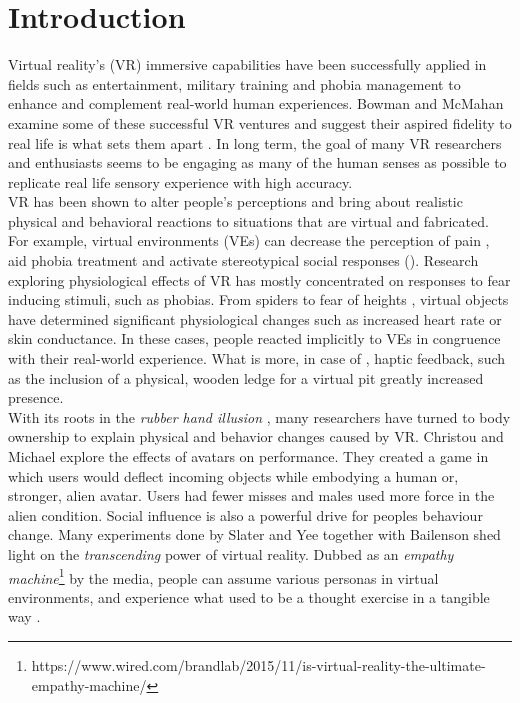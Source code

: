 \section{Introduction}
\label{section:intro}
Virtual reality's (VR) immersive capabilities have been successfully applied in fields such as entertainment, military training and phobia management to enhance and complement real-world human experiences. Bowman and McMahan examine some of these successful VR ventures and suggest their aspired fidelity to real life is what sets them apart \cite{bowman2007virtual}. In long term, the goal of many VR researchers and enthusiasts seems to be engaging as many of the human senses as possible to replicate real life sensory experience with high accuracy.
\\
VR has been shown to alter people's  perceptions and bring about realistic physical and behavioral reactions to situations that are virtual and fabricated. For example, virtual environments (VEs) can decrease the perception of pain \cite{muhlberger2007pain}, aid phobia treatment \cite{parsons2008affective} and activate stereotypical social responses (\cite{dotsch2008virtual}). Research exploring physiological effects of VR has mostly concentrated on responses to fear inducing stimuli, such as phobias. From spiders \cite{garcia2002virtual} to fear of heights \cite{meehan2002physiological}, virtual objects have determined significant physiological changes such as increased heart rate or skin conductance. In these cases, people reacted implicitly to VEs in congruence with their real-world experience. What is more, in case of \cite{meehan2002physiological}, haptic feedback, such as the inclusion of a physical, wooden ledge for a virtual pit greatly increased presence.  
\\
With its roots in the \textit{rubber hand illusion} \cite{botvinick1998rubber}, many researchers have turned to body ownership to explain physical and behavior changes caused by VR. Christou and Michael explore the effects of avatars on performance. They created a game in which users would deflect incoming objects while embodying a human or, stronger, alien avatar. Users had fewer misses and males used more force in the alien condition. Social influence is also a powerful drive for peoples behaviour change. Many experiments done by Slater \cite{slater2014transcending,slater2006virtual} and Yee together with Bailenson \cite{yee2009proteus} shed light on the \textit{transcending} power of virtual reality. Dubbed as an \textit{empathy machine}\footnote{https://www.wired.com/brandlab/2015/11/is-virtual-reality-the-ultimate-empathy-machine/} by the media, people can assume various personas in virtual environments, and experience what used to be a thought exercise in a tangible way \cite{shin2018empathy}.
